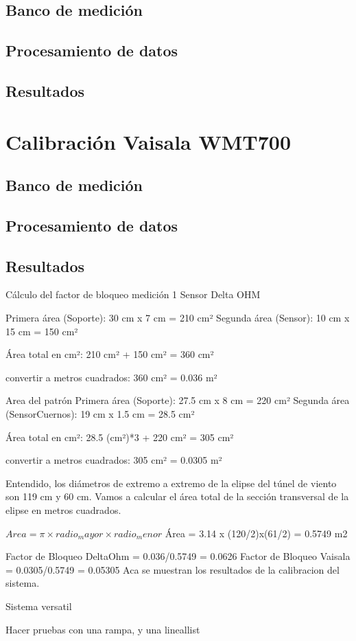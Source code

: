 \subsection{Banco de medición}
\subsection{Procesamiento de datos}
\subsection{Resultados}


\section{Calibración Vaisala WMT700}
\subsection{Banco de medición}
\subsection{Procesamiento de datos}
\subsection{Resultados}


Cálculo del factor de bloqueo medición 1
Sensor Delta OHM

Primera área (Soporte): 30 cm x 7 cm = 210 cm²
Segunda área (Sensor): 10 cm x 15 cm = 150 cm²

Área total en cm²: 210 cm² + 150 cm² = 360 cm²

convertir a metros cuadrados:
360 cm² = 0.036 m²


Area del patrón
Primera área (Soporte): 27.5 cm x 8 cm = 220 cm²
Segunda área (SensorCuernos): 19 cm x 1.5 cm = 28.5 cm²

Área total en cm²: 28.5 (cm²)*3 + 220 cm² =  305 cm²

convertir a metros cuadrados:
305 cm² = 0.0305 m²


Entendido, los diámetros de extremo a extremo de la elipse del túnel de viento son 119 cm y 60 cm. Vamos a calcular el área total de la sección transversal de la elipse en metros cuadrados.

$Area=\pi × radio_mayor × radio_ menor$
Área = 3.14 x (120/2)x(61/2) = 0.5749 m2

Factor de Bloqueo DeltaOhm = 0.036/0.5749 = 0.0626
Factor de Bloqueo Vaisala = 0.0305/0.5749 = 0.05305
Aca se muestran los resultados de la calibracion del sistema.

Sistema versatil

Hacer pruebas con una rampa, y una lineallist